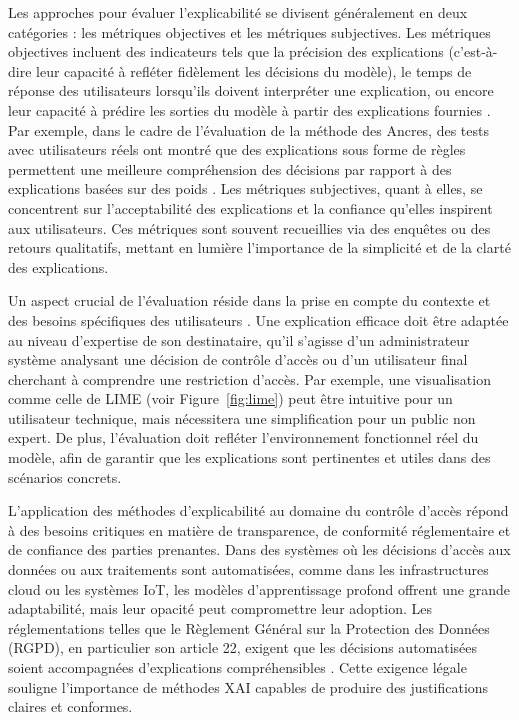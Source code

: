 Les approches pour évaluer l’explicabilité se divisent généralement en deux catégories : les métriques objectives et les métriques subjectives. Les métriques objectives incluent des indicateurs tels que la précision des explications (c’est-à-dire leur capacité à refléter fidèlement les décisions du modèle), le temps de réponse des utilisateurs lorsqu’ils doivent interpréter une explication, ou encore leur capacité à prédire les sorties du modèle à partir des explications fournies \cite{ribeiro2016lime}. Par exemple, dans le cadre de l’évaluation de la méthode des Ancres, des tests avec utilisateurs réels ont montré que des explications sous forme de règles permettent une meilleure compréhension des décisions par rapport à des explications basées sur des poids \cite{ribeiro2016lime}. Les métriques subjectives, quant à elles, se concentrent sur l’acceptabilité des explications et la confiance qu’elles inspirent aux utilisateurs. Ces métriques sont souvent recueillies via des enquêtes ou des retours qualitatifs, mettant en lumière l’importance de la simplicité et de la clarté des explications.


Un aspect crucial de l’évaluation réside dans la prise en compte du contexte et des besoins spécifiques des utilisateurs \cite{dam2018}. Une explication efficace doit être adaptée au niveau d’expertise de son destinataire, qu’il s’agisse d’un administrateur système analysant une décision de contrôle d’accès ou d’un utilisateur final cherchant à comprendre une restriction d’accès. Par exemple, une visualisation comme celle de LIME (voir Figure~\ref{fig:lime}) peut être intuitive pour un utilisateur technique, mais nécessitera une simplification pour un public non expert. De plus, l’évaluation doit refléter l’environnement fonctionnel réel du modèle, afin de garantir que les explications sont pertinentes et utiles dans des scénarios concrets.

L’application des méthodes d’explicabilité au domaine du contrôle d’accès répond à des besoins critiques en matière de transparence, de conformité réglementaire et de confiance des parties prenantes. Dans des systèmes où les décisions d’accès aux données ou aux traitements sont automatisées, comme dans les infrastructures cloud ou les systèmes IoT, les modèles d’apprentissage profond offrent une grande adaptabilité, mais leur opacité peut compromettre leur adoption. Les réglementations telles que le Règlement Général sur la Protection des Données (RGPD), en particulier son article 22, exigent que les décisions automatisées soient accompagnées d’explications compréhensibles \cite{desmoulin2019}. Cette exigence légale souligne l’importance de méthodes XAI capables de produire des justifications claires et conformes.

